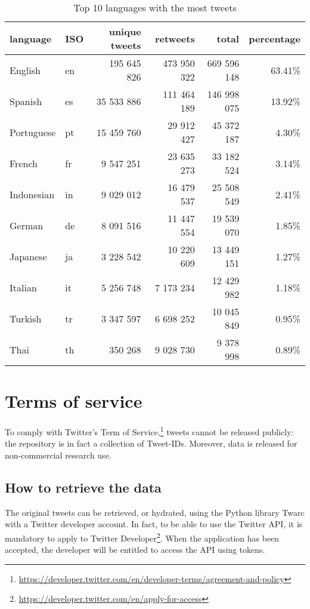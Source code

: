 \begin{table}[H]
    \centering
    \begin{tabularx}{\columnwidth}{@{}XXrrrr@{}}
    		\textbf{language} & \textbf{ISO} & \textbf{unique tweets} & \textbf{retweets} & \textbf{total} & \textbf{percentage} \\
    		\midrule
        English & en & 195 645 826 & 473 950 322 & 669 596 148 & 63.41\% 
        \\
		Spanish & es & 35 533 886 & 111 464 189 & 146 998 075 & 13.92\% 
		\\
		Portuguese & pt & 15 459 760 & 29 912 427 & 45 372 187 & 4.30\% 
		\\
		French & fr & 9 547 251 & 23 635 273 & 33 182 524 & 3.14\% 
		\\
		Indonesian & in & 9 029 012 & 16 479 537 & 25 508 549 & 2.41\%
		\\
		German & de & 8 091 516 & 11 447 554 & 19 539 070 & 1.85\%
		\\
		Japanese & ja & 3 228 542 & 10 220 609 & 13 449 151 & 1.27\%
		\\
		Italian & it & 5 256 748 & 7 173 234 & 12 429 982 & 1.18\%
		\\
		Turkish & tr & 3 347 597 & 6 698 252 & 10 045 849 & 0.95\%
		\\
		Thai & th & 350 268 & 9 028 730 & 9 378 998 & 0.89\%
		\\
		\bottomrule
    \end{tabularx}
    \caption{Top 10 languages with the most tweets}
    \label{tab:dataset-language-stats}
\end{table}

\section{Terms of service}
\label{sec:tos}

To comply with Twitter's Term of Service,\footnote{\url{https://developer.twitter.com/en/developer-terms/agreement-and-policy}} tweets cannot be released publicly: the repository is in fact a collection of Tweet-IDs. Moreover, data is released for non-commercial research use.

\subsection{How to retrieve the data}
\label{subsec:retrieve-data}

The original tweets can be retrieved, or hydrated, using the Python library Twarc with a Twitter developer account. In fact, to be able to use the Twitter API, it is mandatory to apply to Twitter Developer\footnote{\url{https://developer.twitter.com/en/apply-for-access}}. When the application has been accepted, the developer will be entitled to access the API using tokens. 

